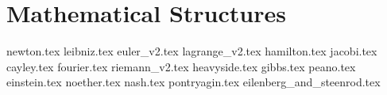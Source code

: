 \part{Mathematical Structures}

{newton.tex}
{leibniz.tex}
{euler_v2.tex}
{lagrange_v2.tex}
{hamilton.tex}
{jacobi.tex}
{cayley.tex}
{fourier.tex}
{riemann_v2.tex}
{heavyside.tex}
{gibbs.tex}
{peano.tex}
{einstein.tex}
{noether.tex}
{nash.tex}
{pontryagin.tex}
{eilenberg_and_steenrod.tex}